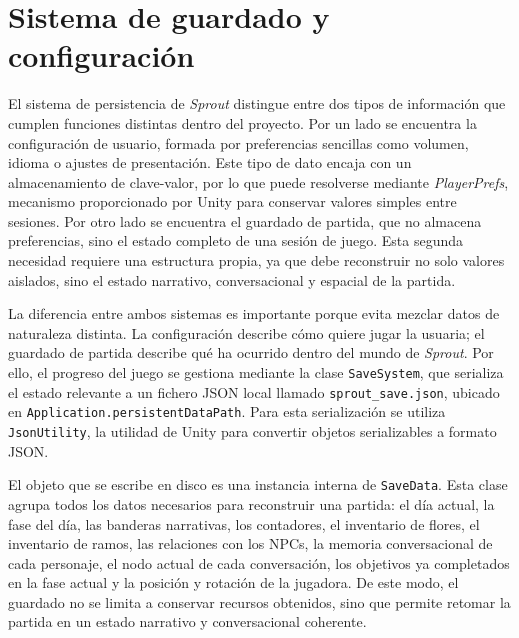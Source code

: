 \documentclass[12pt,twoside,titlepage]{report}
\begin{document}
\section{Sistema de guardado y configuración}
El sistema de persistencia de \textit{Sprout} distingue entre dos tipos de información que cumplen funciones distintas dentro del proyecto. Por un lado se encuentra la configuración de usuario, formada por preferencias sencillas como volumen, idioma o ajustes de presentación. Este tipo de dato encaja con un almacenamiento de clave-valor, por lo que puede resolverse mediante \textit{PlayerPrefs}, mecanismo proporcionado por Unity para conservar valores simples entre sesiones.
Por otro lado se encuentra el  guardado de partida, que no almacena preferencias, sino el estado completo de una sesión de juego. Esta segunda necesidad requiere una estructura propia, ya que debe reconstruir no solo valores aislados, sino el estado narrativo, conversacional y espacial de la partida.

La diferencia entre ambos sistemas es importante porque evita mezclar datos de naturaleza distinta. La configuración describe cómo quiere jugar la usuaria; el guardado de partida describe qué ha ocurrido dentro del mundo de \textit{Sprout}. Por ello, el progreso del juego se gestiona mediante la clase \texttt{SaveSystem}, que serializa el estado relevante a un fichero JSON local llamado \texttt{sprout\_save.json}, ubicado en \texttt{Application.persistentDataPath}. Para esta serialización se utiliza \texttt{JsonUtility}, la utilidad de Unity para convertir objetos serializables a formato JSON.

El objeto que se escribe en disco es una instancia interna de \texttt{SaveData}. Esta clase agrupa todos los datos necesarios para reconstruir una partida: el día actual, la fase del día, las banderas narrativas, los contadores, el inventario de flores, el inventario de ramos, las relaciones con los NPCs, la memoria conversacional de cada personaje, el nodo actual de cada conversación, los objetivos ya completados en la fase actual y la posición y rotación de la jugadora. De este modo, el guardado no se limita a conservar recursos obtenidos, sino que permite retomar la partida en un estado narrativo y conversacional coherente.
\end{document}
